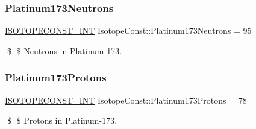 \subsubsection{\texorpdfstring{Platinum173\+Neutrons}{Platinum173Neutrons}}
{\footnotesize\ttfamily \mbox{\hyperlink{group___isotope_const-_macros_ga5f18360b3e99483a35c32d789e62621c}{I\+S\+O\+T\+O\+P\+E\+C\+O\+N\+S\+T\+\_\+\+I\+NT}} Isotope\+Const\+::\+Platinum173\+Neutrons = 95}

\$ \$ Neutrons in Platinum-\/173. \mbox{\label{group___isotope_const-_platinum-_pt173_ga7696fb79e86ba0a145583fd72394cceb}} 
\subsubsection{\texorpdfstring{Platinum173\+Protons}{Platinum173Protons}}
{\footnotesize\ttfamily \mbox{\hyperlink{group___isotope_const-_macros_ga5f18360b3e99483a35c32d789e62621c}{I\+S\+O\+T\+O\+P\+E\+C\+O\+N\+S\+T\+\_\+\+I\+NT}} Isotope\+Const\+::\+Platinum173\+Protons = 78}

\$ \$ Protons in Platinum-\/173. 